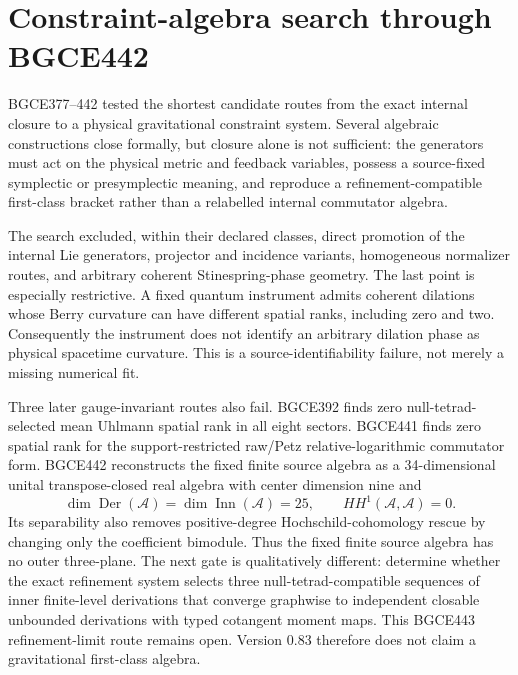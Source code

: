 \documentclass[11pt]{article}
\theoremstyle{definition}
\theoremstyle{remark}
\begin{document}
\section{Constraint-algebra search through BGCE442}\label{sec:constraints083}

BGCE377--442 tested the shortest candidate routes from the exact internal closure to a physical gravitational constraint system. Several algebraic constructions close formally, but closure alone is not sufficient: the generators must act on the physical metric and feedback variables, possess a source-fixed symplectic or presymplectic meaning, and reproduce a refinement-compatible first-class bracket rather than a relabelled internal commutator algebra.

The search excluded, within their declared classes, direct promotion of the internal Lie generators, projector and incidence variants, homogeneous normalizer routes, and arbitrary coherent Stinespring-phase geometry. The last point is especially restrictive. A fixed quantum instrument admits coherent dilations whose Berry curvature can have different spatial ranks, including zero and two. Consequently the instrument does not identify an arbitrary dilation phase as physical spacetime curvature. This is a source-identifiability failure, not merely a missing numerical fit.

Three later gauge-invariant routes also fail. BGCE392 finds zero null-tetrad-selected mean Uhlmann spatial rank in all eight sectors. BGCE441 finds zero spatial rank for the support-restricted raw/Petz relative-logarithmic commutator form. BGCE442 reconstructs the fixed finite source algebra as a 34-dimensional unital transpose-closed real algebra with center dimension nine and
\begin{equation}
 \dim\operatorname{Der}(\mathcal A)
 =\dim\operatorname{Inn}(\mathcal A)=25,
 \qquad
 HH^1(\mathcal A,\mathcal A)=0.
\end{equation}
Its separability also removes positive-degree Hochschild-cohomology rescue by changing only the coefficient bimodule. Thus the fixed finite source algebra has no outer three-plane. The next gate is qualitatively different: determine whether the exact refinement system selects three null-tetrad-compatible sequences of inner finite-level derivations that converge graphwise to independent closable unbounded derivations with typed cotangent moment maps. This BGCE443 refinement-limit route remains open. Version 0.83 therefore does not claim a gravitational first-class algebra.
\end{document}
